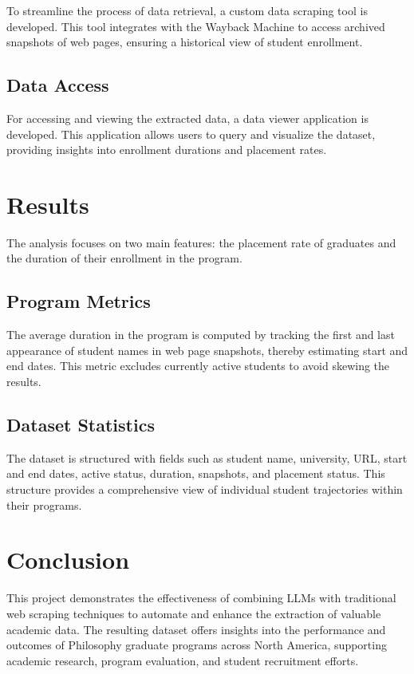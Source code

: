 \documentclass[11pt]{article}
\begin{document}
    To streamline the process of data retrieval, a custom data scraping tool is developed. This tool integrates with the Wayback Machine to access archived snapshots of web pages, ensuring a historical view of student enrollment.

\subsection{Data Access}

    For accessing and viewing the extracted data, a data viewer application is developed. This application allows users to query and visualize the dataset, providing insights into enrollment durations and placement rates.

\section{Results}

    The analysis focuses on two main features: the placement rate of graduates and the duration of their enrollment in the program.

\subsection{Program Metrics}

    The average duration in the program is computed by tracking the first and last appearance of student names in web page snapshots, thereby estimating start and end dates. This metric excludes currently active students to avoid skewing the results.

\subsection{Dataset Statistics}

    The dataset is structured with fields such as student name, university, URL, start and end dates, active status, duration, snapshots, and placement status.
    This structure provides a comprehensive view of individual student trajectories within their programs.

\section{Conclusion}

    This project demonstrates the effectiveness of combining LLMs with traditional web scraping techniques to automate and enhance the extraction of valuable academic data.
    The resulting dataset offers insights into the performance and outcomes of Philosophy graduate programs across North America, supporting academic research, program evaluation, and student recruitment efforts.
\end{document}
